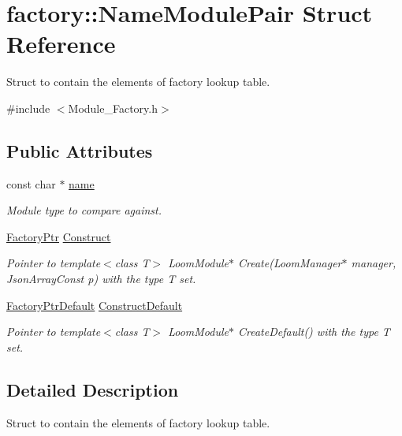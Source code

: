 \hypertarget{structfactory_1_1_name_module_pair}{}\section{factory\+:\+:Name\+Module\+Pair Struct Reference}
\label{structfactory_1_1_name_module_pair}


Struct to contain the elements of factory lookup table.  




{\ttfamily \#include $<$Module\+\_\+\+Factory.\+h$>$}

\subsection*{Public Attributes}
\begin{DoxyCompactItemize}
\item 
const char $\ast$ \hyperlink{structfactory_1_1_name_module_pair_abd0feebc88465d1acbd71eb3ed632fe2}{name}
\begin{DoxyCompactList}\small\item\em Module type to compare against. \end{DoxyCompactList}\item 
\hyperlink{namespacefactory_a3032a25e556f11cb0899c2b3abc95283}{Factory\+Ptr} \hyperlink{structfactory_1_1_name_module_pair_ada6abb90038e59d80f8b0bbfa2b0f39b}{Construct}
\begin{DoxyCompactList}\small\item\em Pointer to \textquotesingle{}template$<$class T$>$ Loom\+Module$\ast$ Create(\+Loom\+Manager$\ast$ manager, Json\+Array\+Const p)\textquotesingle{} with the type T set. \end{DoxyCompactList}\item 
\hyperlink{namespacefactory_aa63dbcb7fe5c455558ae48b029500d77}{Factory\+Ptr\+Default} \hyperlink{structfactory_1_1_name_module_pair_ad0df41ece733325bc0b1ba75f7e38e07}{Construct\+Default}
\begin{DoxyCompactList}\small\item\em Pointer to \textquotesingle{}template$<$class T$>$ Loom\+Module$\ast$ Create\+Default()\textquotesingle{} with the type T set. \end{DoxyCompactList}\end{DoxyCompactItemize}


\subsection{Detailed Description}
Struct to contain the elements of factory lookup table. 


